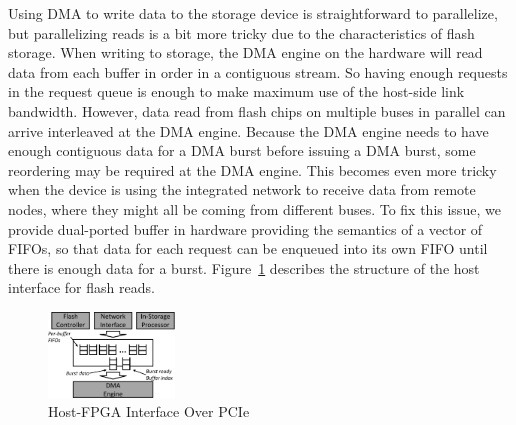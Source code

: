 Using DMA to write data to the storage device is straightforward to parallelize,
but parallelizing reads is a bit more tricky due to the characteristics of flash
storage. When writing to storage, the DMA engine on the hardware will read data
from each buffer in order in a contiguous stream. So having enough requests in
the request queue is enough to make maximum use of the host-side link bandwidth.
However, data read from flash chips on multiple buses in parallel can arrive
interleaved at the DMA engine. Because the DMA engine needs to have enough
contiguous data for a DMA burst before issuing a DMA burst, some reordering may
be required at the DMA engine. This becomes even more tricky when the device is
using the integrated network to receive data from remote nodes, where they might
all be coming from different buses. To fix this issue, we provide dual-ported
buffer in hardware providing the semantics of a vector of FIFOs, so that data
for each request can be enqueued into its own FIFO until there is enough data
for a burst.
Figure~\ref{fig:hostinterface} describes the structure of the host interface for
flash reads.

\begin{figure}[ht!]
	\centering
	\includegraphics[width=0.3\textwidth]{figures/dmawrite-crop.pdf}
	\caption{Host-FPGA Interface Over PCIe}
	\label{fig:hostinterface}
\end{figure}

